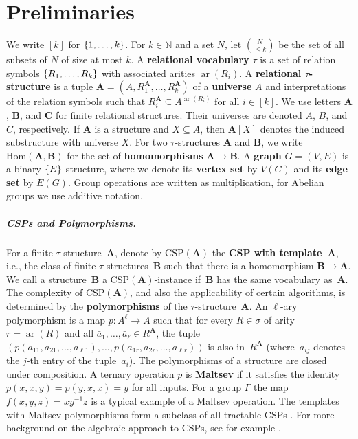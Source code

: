 \documentclass[a4paper,english, thm-restate]{lipics-v2021}
\newcommand{\nat}{\mathbb{N}}
\newcommand{\defining}[1]{\textbf{#1}}
\DeclarePairedDelimiter\set{\lbrace}{\rbrace}
\newcommand{\sig}{\tau}
\newcommand{\arity}[1]{\operatorname*{ar}(#1)}
\newcommand{\StructA}{\mathbf{A}}
\newcommand{\StructB}{\mathbf{B}}
\newcommand{\StructC}{\mathbf{C}}
\newcommand{\CSP}[1]{\mathrm{CSP}(#1)}
\newcommand{\Hom}[2]{\mathrm{Hom}(#1,#2)}
\begin{document}
	
	
	\section{Preliminaries}
	We write $[k]$ for $\set{1,\dots ,k}$.
	For $k \in \nat$ and a set $N$, let $\binom{N}{\leq k}$ be
	the set of  all subsets of $N$  of size at most $k$.
	A \defining{relational vocabulary} $\sig$ is a set of relation symbols $\set{R_1,\dots,R_k}$
	with associated arities $\arity{R_i}$.
	A \defining{relational $\sig$-structure} is a tuple $\StructA= (A,R_1^\StructA,\dots, R_k^\StructA)$ of a \defining{universe} $A$ and interpretations of the relation symbols
	such that $R_i^\StructA \subseteq A^{\arity{R_i}}$ for all $i \in [k]$.
	We use letters $\StructA$, $\StructB$, and $\StructC$ for finite relational structures.
	Their universes are denoted $A$, $B$, and~$C$, respectively.
	If $\StructA$ is a structure and $X \subseteq A$, then $\StructA[X]$ denotes the induced substructure with universe $X$.
	For two $\sig$-structures $\StructA$ and $\StructB$, we write $\Hom{\StructA}{\StructB}$ for the set of \defining{homomorphisms} ${\StructA \to \StructB}$.
	A \defining{graph} $G=(V,E)$ is a binary $\set{E}$-structure,
	where we denote its \defining{vertex set} by $V(G)$ and its \defining{edge set} by $E(G)$.
Group operations are written as multiplication,
	for Abelian groups we use additive notation.
	
	
	
	
	\subparagraph{CSPs and Polymorphisms.}
	For a finite $\sig$-structure~$\StructA$, denote by $\CSP{\StructA}$
	the \defining{CSP with template~$\StructA$}, i.e., the class of finite $\sig$-structures~$\StructB$
	such that there is a homomorphism $\StructB \to \StructA$.
	We call a structure~$\StructB$ a $\CSP{\StructA}$-instance
	if~$\StructB$ has the same vocabulary as~$\StructA$.
	The complexity of $\CSP{\StructA}$, and also the applicability of certain algorithms, is determined by the \defining{polymorphisms} of the $\sig$\nobreakdash-structure~$\StructA$. An $\ell$-ary polymorphism is a map $p\colon A^{\ell} \to A$ such that for every $R \in \sigma$
	of arity $r=\arity{R}$ and all $\bar{a}_1,\dots,\bar{a}_\ell \in R^{\StructA}$,
	the tuple $(p(a_{11}, a_{21}, \dots, a_{\ell1}), \dots, p(a_{1r}, a_{2r}, \dots, a_{\ell r}))$ is also in~$R^{\StructA}$ (where~$a_{ij}$ denotes the $j$-th entry of the tuple~$\bar{a}_i$).
The polymorphisms of a structure are closed under composition.
A ternary operation $p$ is \defining{Maltsev} if it satisfies the identity $p(x,x,y) = p(y,x,x) = y$ for all inputs. 
	For a group $\Gamma$ the map $f(x,y,z) = x y^{-1} z$ is a typical example of a Maltsev operation.
	The templates with Maltsev polymorphisms form a subclass of all tractable CSPs \cite{BulatovDalmau2006}. 
	For more background on the algebraic approach to CSPs, see for example \cite{BartoKrokhinRoss}.
	
\end{document}
